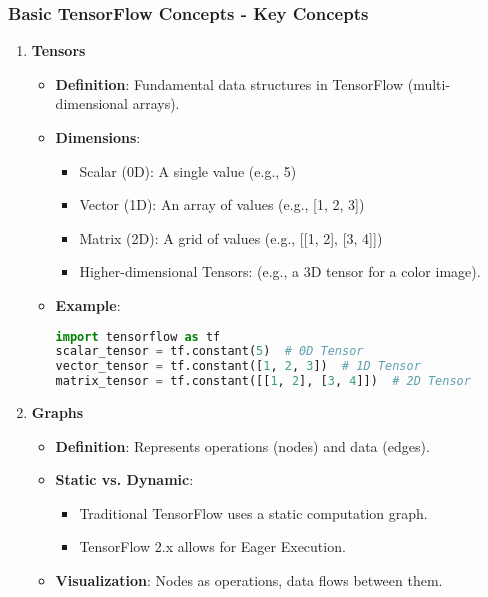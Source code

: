 \documentclass[aspectratio=169]{beamer}
\begin{document}
\begin{frame}[fragile]
    \frametitle{Basic TensorFlow Concepts - Key Concepts}
    
    \begin{enumerate}
        \item \textbf{Tensors}
        \begin{itemize}
            \item \textbf{Definition}: Fundamental data structures in TensorFlow (multi-dimensional arrays).
            \item \textbf{Dimensions}:
                \begin{itemize}
                    \item Scalar (0D): A single value (e.g., 5)
                    \item Vector (1D): An array of values (e.g., [1, 2, 3])
                    \item Matrix (2D): A grid of values (e.g., [[1, 2], [3, 4]])
                    \item Higher-dimensional Tensors: (e.g., a 3D tensor for a color image).
                \end{itemize}
            \item \textbf{Example}:
            \begin{lstlisting}[language=Python]
import tensorflow as tf
scalar_tensor = tf.constant(5)  # 0D Tensor
vector_tensor = tf.constant([1, 2, 3])  # 1D Tensor
matrix_tensor = tf.constant([[1, 2], [3, 4]])  # 2D Tensor
            \end{lstlisting}
        \end{itemize}
        
        \item \textbf{Graphs}
        \begin{itemize}
            \item \textbf{Definition}: Represents operations (nodes) and data (edges).
            \item \textbf{Static vs. Dynamic}:
                \begin{itemize}
                    \item Traditional TensorFlow uses a static computation graph.
                    \item TensorFlow 2.x allows for Eager Execution.
                \end{itemize}
            \item \textbf{Visualization}: Nodes as operations, data flows between them.
        \end{itemize}
    \end{enumerate}
\end{frame}
\end{document}
